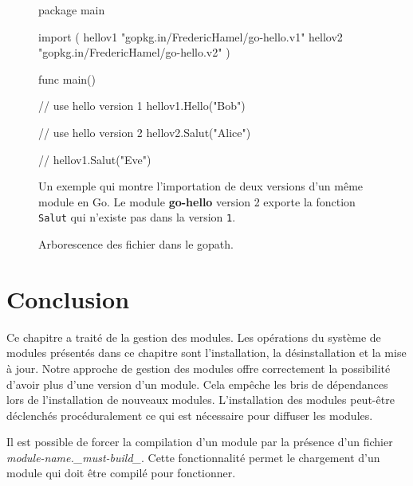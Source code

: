 \begin{figure}[h]
\begin{mplisting}{1}
package main

import (
  hellov1 "gopkg.in/FredericHamel/go-hello.v1"
  hellov2 "gopkg.in/FredericHamel/go-hello.v2"
)

func main() {
  // use hello version 1
  hellov1.Hello("Bob")

  // use hello version 2
  hellov2.Salut("Alice")

  // hellov1.Salut("Eve")
}
\end{mplisting}
  \caption{Un exemple qui montre l'importation de deux versions d'un même module
    en Go. Le module \textbf{go-hello} version 2 exporte la fonction \texttt{Salut}
    qui n'existe pas dans la version \texttt{1}.}
\end{figure}


\begin{figure}[ht]
  \centering
  \lstset{frame=single}
  \caption{Arborescence des fichier dans le gopath.}
  \label{fig:organisation_go}
\end{figure}

\section{Conclusion}
%
Ce chapitre a traité de la gestion des modules.  Les opérations du système de
modules présentés dans ce chapitre sont l'installation, la désinstallation et
la mise à jour.  Notre approche de gestion des modules offre correctement la
possibilité d'avoir plus d'une version d'un module. Cela empêche les bris de
dépendances lors de l'installation de nouveaux modules.  L'installation des
modules peut-être déclenchés procéduralement ce qui est nécessaire pour diffuser
les modules.

Il est possible de forcer la compilation d'un module par la présence d'un fichier
\textit{module-name.\_must-build\_}. Cette fonctionnalité permet le chargement d'un
module qui doit être compilé pour fonctionner.


